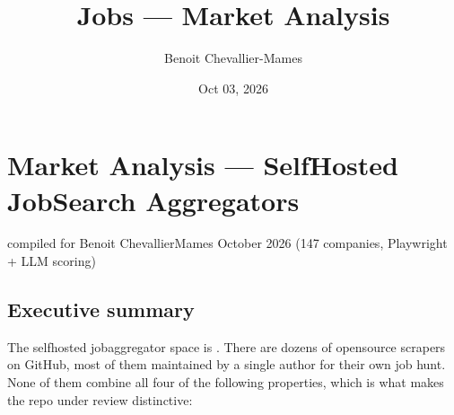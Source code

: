 \documentclass[a4paper,11pt,english]{sphinxmanual}
\title{Jobs — Market Analysis}
\date{Oct 03, 2026}
\author{Benoit Chevallier-Mames}
\begin{document}
\pagestyle{empty}
\sphinxmaketitle
\pagestyle{plain}
\sphinxtableofcontents
\pagestyle{normal}
\label{\detokenize{index::doc}}


\sphinxstepscope


\chapter{Market Analysis — Self\sphinxhyphen{}Hosted Job\sphinxhyphen{}Search Aggregators}
\label{\detokenize{analysis:market-analysis-self-hosted-job-search-aggregators}}\label{\detokenize{analysis::doc}}
\sphinxAtStartPar
{} compiled for Benoit Chevallier\sphinxhyphen{}Mames
 October 2026
  (147 companies, Playwright + LLM scoring)


\section{Executive summary}
\label{\detokenize{analysis:executive-summary}}
\sphinxAtStartPar
The self\sphinxhyphen{}hosted job\sphinxhyphen{}aggregator space is . There are
dozens of open\sphinxhyphen{}source scrapers on GitHub, most of them maintained by a single
author for their own job hunt. None of them combine all four of the following
properties, which is what makes the repo under review distinctive:
\end{document}
